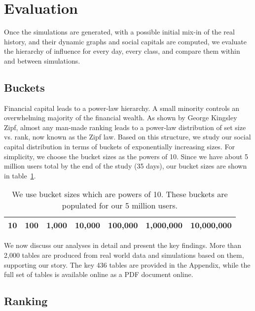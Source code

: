 \documentclass[10pt,oneside]{memoir}
\begin{document}

\pagebreak \section{Evaluation}
\label{evaluation}

Once the simulations are generated, with a possible initial mix-in of the real history, and their dynamic graphs and social capitals are computed, we evaluate the hierarchy of influence for every day, every class, and compare them within and between simulations.


\subsection{Buckets}
\label{buckets}

Financial capital leads to a power-law hierarchy.  A small minority controls an overwhelming majority of the financial wealth.  As shown by George Kingsley Zipf, almost any man-made ranking leads to a power-law distribution of set size vs. rank, now known as the Zipf law.  Based on this structure, we study our social capital distribution in terms of buckets of exponentially increasing sizes.
For simplicity, we choose the bucket sizes as the powers of 10.  Since we have about 5 million users total by the end of the study (35 days), our bucket sizes are shown in table~\ref{table:bucket-sizes}.

\begin{table}
\begin{tabular}{|ccccccc|}
\toprule
10 & 100 & 1,000 & 10,000 & 100,000 & 1,000,000 & 10,000,000 \\
\bottomrule
\end{tabular}
\label{table:bucket-sizes}
\caption{We use bucket sizes which are powers of 10.  These buckets are populated for our 5 million users.}
\end{table}

We now discuss our analyses in detail and present the key findings.  More than 2,000 tables are produced from real world data and simulations based on them, supporting our story.  The key 436 tables are provided in the Appendix, while the full set of tables is available online as a PDF document online.


\subsection{Ranking}
\label{ranking}
\end{document}
